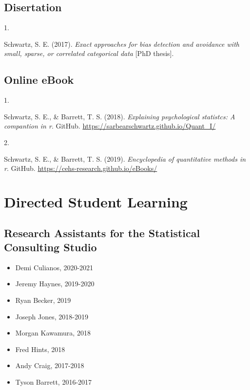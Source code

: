 \documentclass[11pt,a4paper,]{moderncv}
\providecommand{\tightlist}{%
	\setlength{\itemsep}{0pt}\setlength{\parskip}{0pt}}
\newlength{\csllabelwidth}
\newcommand{\CSLLeftMargin}[1]{\parbox[t]{\csllabelwidth}{#1}}
\newcommand{\CSLRightInline}[1]{\parbox[t]{\linewidth - \csllabelwidth}{#1}}
\begin{document}
\vspace{7mm}

\hypertarget{disertation}{%
\subsection{\texorpdfstring{\textbf{Disertation}}{Disertation}}\label{disertation}}

\hypertarget{refs_student}{}
\leavevmode\hypertarget{ref-schwartz2017exact}{}%
\CSLLeftMargin{1. }
\CSLRightInline{Schwartz, S. E. (2017). \emph{Exact approaches for bias
detection and avoidance with small, sparse, or correlated categorical
data} {[}PhD thesis{]}.}

\vspace{7mm}

\hypertarget{online-ebook}{%
\subsection{\texorpdfstring{\textbf{Online
eBook}}{Online eBook}}\label{online-ebook}}

\hypertarget{refs_ebook}{}
\leavevmode\hypertarget{ref-eBook6600}{}%
\CSLLeftMargin{1. }
\CSLRightInline{Schwartz, S. E., \& Barrett, T. S. (2018).
\emph{Explaining psychological statistcs: A compantion in r}. GitHub.
\url{https://sarbearschwartz.github.io/Quant_I/}}

\leavevmode\hypertarget{ref-eBookEncyclopedia}{}%
\CSLLeftMargin{2. }
\CSLRightInline{Schwartz, S. E., \& Barrett, T. S. (2019).
\emph{Encyclopedia of quantitative methods in r}. GitHub.
\url{https://cehs-research.github.io/eBooks/}}

\clearpage

\hypertarget{directed-student-learning}{%
\section{Directed Student Learning}\label{directed-student-learning}}

\hypertarget{research-assistants-for-the-statistical-consulting-studio}{%
\subsection{\texorpdfstring{\textbf{Research Assistants for the
Statistical Consulting
Studio}}{Research Assistants for the Statistical Consulting Studio}}\label{research-assistants-for-the-statistical-consulting-studio}}

\begin{itemize}
\tightlist
\item
  Demi Culianos, 2020-2021
\item
  Jeremy Haynes, 2019-2020
\item
  Ryan Becker, 2019
\item
  Joseph Jones, 2018-2019
\item
  Morgan Kawamura, 2018
\item
  Fred Hints, 2018
\item
  Andy Craig, 2017-2018
\item
  Tyson Barrett, 2016-2017
\end{itemize}
\end{document}

